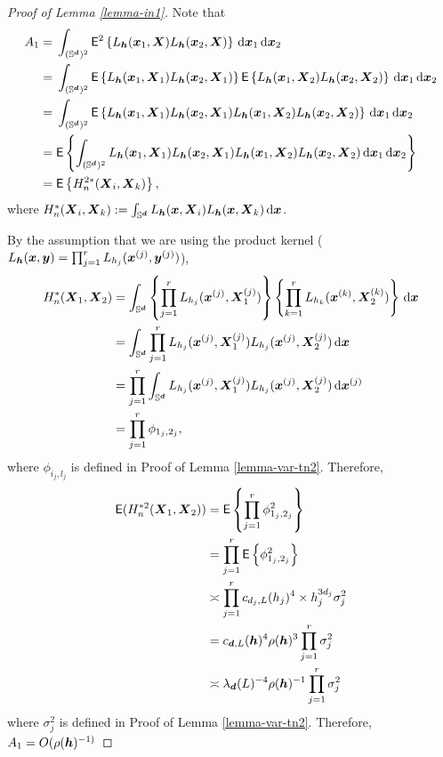 \documentclass[oneside,11pt]{article}
\begin{document}
\begin{proof}[Proof of Lemma \ref{lemma-in1}]
Note that
\begin{align*}
    A_1 =&\; \int_{(\Sr)^2} \mathsf{E}^2 \lrb{{L}_{\bh} (\bx_1,\bX){L}_{\bh} (\bx_2,\bX)}\,\rd \bx_1 \,\rd \bx_2 \\
    =&\; \int_{(\Sr)^2} \mathsf{E} \lrb{{L}_{\bh} (\bx_1,\bX_1){L}_{\bh} (\bx_2,\bX_1)} \mathsf{E} \lrb{{L}_{\bh} (\bx_1,\bX_2){L}_{\bh} (\bx_2,\bX_2)} \,\rd \bx_1 \,\rd \bx_2 \\
    =&\; \int_{(\Sr)^2} \mathsf{E} \lrb{{L}_{\bh} (\bx_1,\bX_1){L}_{\bh} (\bx_2,\bX_1) {L}_{\bh} (\bx_1,\bX_2){L}_{\bh} (\bx_2,\bX_2)} \,\rd \bx_1 \,\rd \bx_2 \\
    =&\;  \mathsf{E} \lrb{ \int_{(\Sr)^2}{L}_{\bh} (\bx_1,\bX_1){L}_{\bh} (\bx_2,\bX_1) {L}_{\bh} (\bx_1,\bX_2){L}_{\bh} (\bx_2,\bX_2) \,\rd \bx_1 \,\rd \bx_2} \\
    =&\;  \mathsf{E} \lrb{H_n^{2*} (\bX_i,\bX_k)},
\end{align*}
where $H_n^* (\bX_i,\bX_k) \defin \int_{\Sr} L_{\bh} (\bx,\bX_i) L_{\bh} (\bx,\bX_k) \,\rd \bx$.

By the assumption that we are using the product kernel  ($L_{\bh} (\bx,\by) = \prod_{j=1}^r L_{h_j} (\bx^{(j)},\by^{(j)})$),
    \begin{align*}
        H_n^* (\bX_1,\bX_2) &= \int_{\Sr} \lrb{\prod_{j=1}^r L_{h_j} (\bx^{(j)},\bX_1^{(j)})} \lrb{\prod_{k=1}^r L_{h_k} (\bx^{(k)},\bX_2^{(k)})} \,\rd \bx \\
        &= \int_{\Sr} \prod_{j=1}^r L_{h_j} (\bx^{(j)},\bX_1^{(j)}) L_{h_j}(\bx^{(j)},\bX_2^{(j)}) \,\rd \bx \\
        &= \prod_{j=1}^r \int_{\Sr} L_{h_j} (\bx^{(j)},\bX_1^{(j)}) L_{h_j}(\bx^{(j)},\bX_2^{(j)}) \,\rd \bx^{(j)} \\
        &= \prod_{j=1}^r \phi_{1_j,2_j},
    \end{align*}
    where $\phi_{i_j,l_j}$ is defined in Proof of Lemma \ref{lemma-var-tn2}. Therefore,
    \begin{align*}
        \mathsf{E}(H_n^{*2}(\bX_1,\bX_2)) &=  
        \mathsf{E} \lrb{\prod_{j=1}^r \phi_{1_j,2_j}^2} \\
        &=  \prod_{j=1}^r \mathsf{E} \lrb{ \phi_{1_j,2_j}^2} \\
        &\asymp \prod_{j=1}^r c_{d_j,L}(h_j)^4\times h_j^{3d_j} \sigma_j^2 \\
        &= c_{\bd,L}(\bh)^4 \rho(\bh)^3 \prod_{j=1}^r \sigma_j^2\\
        &\asymp  \lambda_{\bd}(L)^{-4} \rho(\bh)^{-1} \prod_{j=1}^r \sigma_j^2
    \end{align*}
    where $\sigma_j^2$ is defined in Proof of Lemma \ref{lemma-var-tn2}. Therefore, $A_1 = O(\rho(\bh)^{-1)}$


\end{proof}
\end{document}
